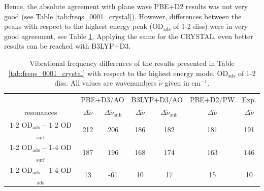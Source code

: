 \documentclass[11pt,DIV=13,BCOR=5mm,a4paper,headinclude]{scrbook}
\begin{document}
Hence, the absolute agreement with plane wave PBE+D2 results was not very good (see Table \ref{tab:freqs_0001_crystal}).
However, differences between the peaks with respect to the highest energy peak (OD$_\textrm{ads}$ of 1-2 diss) were in very good agreement, see Table \ref{tab:freqs_0001_crystal-relative}.
Applying the same for the CRYSTAL, even better results can be reached with B3LYP+D3.
\begin{table}[!h]
  \centering
  \caption{Vibrational frequency differences of the results presented in Table \ref{tab:freqs_0001_crystal} with respect to the highest energy mode, OD$_\textrm{ads}$ of 1-2 diss.
All values are wavenumbers $\tilde{\nu}$ given in cm$^{-1}$.}
  \begin{tabular}{c|cc|cc|c|c}
  \toprule
   & \multicolumn{2}{c}{PBE+D3/AO} & \multicolumn{2}{c}{B3LYP+D3/AO} &PBE+D2/PW&Exp.\cite{Wirth2014}\\
   resonances & $\Delta\tilde{\nu}$ & $\Delta\tilde{\nu}_\textrm{anh}$ & $\Delta\tilde{\nu}$ & $\Delta\tilde{\nu}_\textrm{anh}$ & $\Delta\tilde{\nu}$ & $\Delta\tilde{\nu}$\\\midrule
  1-2 OD$_\textrm{ads}-$1-2 OD$_\textrm{surf}$&212 &206 &186 &182 &181 &191 \\
  1-2 OD$_\textrm{ads}-$1-4 OD$_\textrm{surf}$&187 &196 &168 &174 &163 &146 \\
  1-2 OD$_\textrm{ads}-$1-4 OD$_\textrm{ads}$ &13 &-61 &10 &17 &15 &10 \\\bottomrule
    \end{tabular}
  \label{tab:freqs_0001_crystal-relative}
\end{table}
\end{document}
